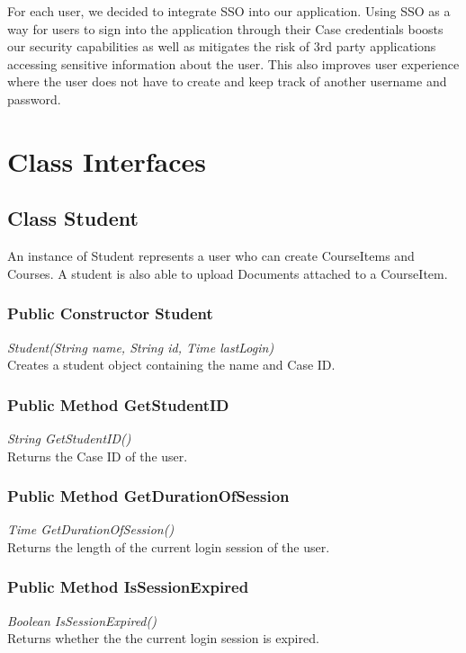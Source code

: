 \documentclass{scrreprt}
\begin{document}
\hspace{10mm}For each user, we decided to integrate SSO into our application. Using SSO as a way for users to sign into the application through their Case credentials boosts our security capabilities as well as mitigates the risk of 3rd party applications accessing sensitive information about the user. This also improves user experience where the user does not have to create and keep track of another username and password. 



\chapter{Class Interfaces}

\section{Class Student}
An instance of Student represents a user who can create CourseItems and 		Courses. A student is also able to upload Documents attached to a CourseItem.
\subsection{Public Constructor Student}
\textit{Student(String name, String id, Time lastLogin)} \\
Creates a student object containing the name and Case ID.

\subsection{Public Method GetStudentID}
\textit{String GetStudentID()} \\
Returns the Case ID of the user.

\subsection{Public Method GetDurationOfSession}
\textit{Time GetDurationOfSession()} \\
Returns the length of the current login session of the user.

\subsection{Public Method IsSessionExpired}
\textit{Boolean IsSessionExpired()} \\
Returns whether the the current login session is expired.
\end{document}
